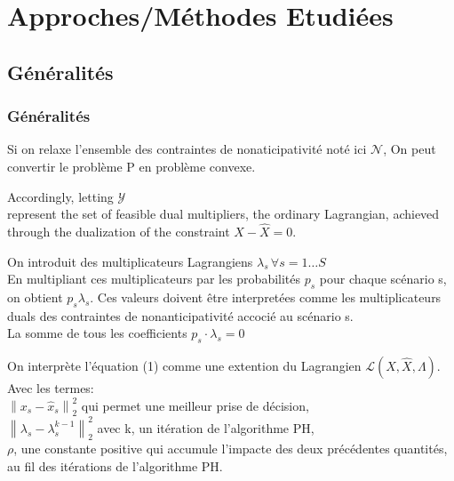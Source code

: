 \documentclass[10pt]{beamer}
\newcommand{\Lagr}{\mathcal{L}}
\newcommand\norm[1]{\left\lVert#1\right\rVert}
\begin{document}
    \section{Approches/Méthodes Etudiées}
    \subsection{Généralités}
    \begin{frame}
        \frametitle{Généralités}
        Si on relaxe l'ensemble des contraintes de nonaticipativité noté ici $\mathcal{N}$, On peut convertir le problème P en problème convexe.
    \end{frame}
    
    \begin{frame}
        Accordingly, letting $\mathcal{Y}$\\ %
        represent the set of feasible dual multipliers, the ordinary Lagrangian, achieved through the dualization
of the constraint $X - \hat{X} = 0$.
    \end{frame}
    
    
    \begin{frame}
        On introduit des multiplicateurs Lagrangiens $\lambda_s \, \forall s = 1 \ldots S$\\
        En multipliant ces multiplicateurs par les probabilités $p_s$ pour chaque scénario s, on obtient $p_s\lambda_s$. Ces valeurs doivent être interpretées comme les multiplicateurs duals des contraintes de nonanticipativité accocié au scénario s.\\
        La somme de tous les coefficients $p_s\cdot\lambda_s = 0$
    \end{frame}
    
    \begin{frame}
        On interprète l'équation (1) comme une extention du Lagrangien $\Lagr(X, \hat{X}, \Lambda)$.\\
            
        Avec les termes:\\
        $\norm{x_s - \hat{x}_s}^{2}_{2}$ qui permet une meilleur prise de décision,\\
        $\norm{\lambda_s - \lambda^{k-1}_{s}}^{2}_{2}$ avec k, un itération de l'algorithme PH,\\
        $\rho$, une constante positive qui accumule l'impacte des deux précédentes quantités, au fil des itérations de l'algorithme PH.
    \end{frame}
    
\end{document}
